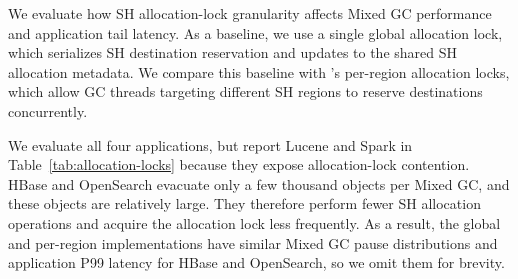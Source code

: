 We evaluate how SH allocation-lock granularity affects Mixed GC performance and application tail latency.
As a baseline, we use a single global allocation lock, which serializes SH destination reservation and updates to the shared SH allocation metadata.
We compare this baseline with \chipperName{}'s per-region allocation locks, which allow GC threads targeting different SH regions to reserve destinations concurrently.

We evaluate all four applications, but report Lucene and Spark in Table~\ref{tab:allocation-locks} because they expose allocation-lock contention.
HBase and OpenSearch evacuate only a few thousand objects per Mixed GC, and these objects are relatively large.
They therefore perform fewer SH allocation operations and acquire the allocation lock less frequently.
As a result, the global and per-region implementations have similar Mixed GC pause distributions and application P99 latency for HBase and OpenSearch, so we omit them for brevity.

